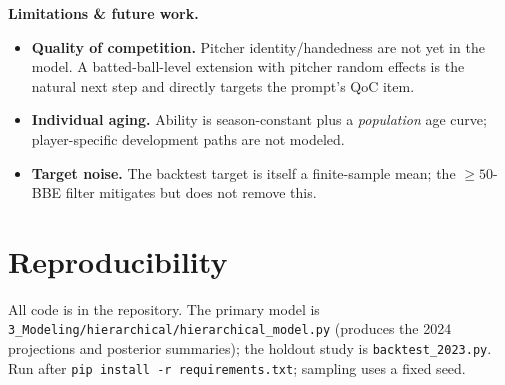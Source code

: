 \documentclass[11pt]{article}
\begin{document}
\textbf{Limitations \& future work.}
\begin{itemize}
  \item \textbf{Quality of competition.} Pitcher identity/handedness are not yet in
        the model. A batted-ball-level extension with pitcher random effects is the
        natural next step and directly targets the prompt's QoC item.
  \item \textbf{Individual aging.} Ability is season-constant plus a \emph{population}
        age curve; player-specific development paths are not modeled.
  \item \textbf{Target noise.} The backtest target is itself a finite-sample mean;
        the $\ge 50$-BBE filter mitigates but does not remove this.
\end{itemize}

\section{Reproducibility}
All code is in the repository. The primary model is
\texttt{3\_Modeling/hierarchical/hierarchical\_model.py} (produces the 2024
projections and posterior summaries); the holdout study is
\texttt{backtest\_2023.py}. Run after \texttt{pip install -r requirements.txt};
sampling uses a fixed seed.
\end{document}
